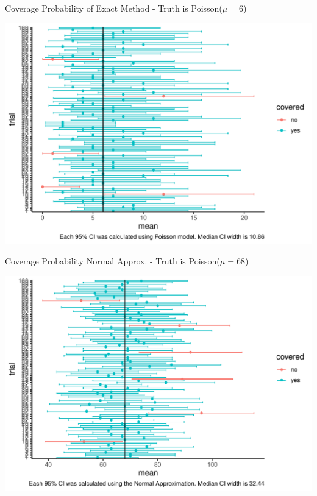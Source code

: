\documentclass[10pt,handout]{beamer}\usepackage[]{graphicx}\usepackage[]{color}
\makeatletter
\def\maxwidth{ %
  \ifdim\Gin@nat@width>\linewidth
    \linewidth
  \else
    \Gin@nat@width
  \fi
}
\newenvironment{knitrout}{}{} %
\makeatother
\begin{document}
\begin{frame}[fragile]{Coverage Probability of Exact Method - Truth is Poisson($\mu=6$)}
	
\begin{knitrout}\tiny
{}\color{fgcolor}

{\centering \includegraphics[width=\maxwidth]{figure/unnamed-chunk-5-1} 

}



\end{knitrout}
	
\end{frame}



\begin{frame}[fragile]{Coverage Probability Normal Approx. - Truth is Poisson($\mu=68$)}
	
\begin{knitrout}\tiny
{}\color{fgcolor}

{\centering \includegraphics[width=\maxwidth]{figure/unnamed-chunk-6-1} 

}



\end{knitrout}
	
\end{frame}
\end{document}
